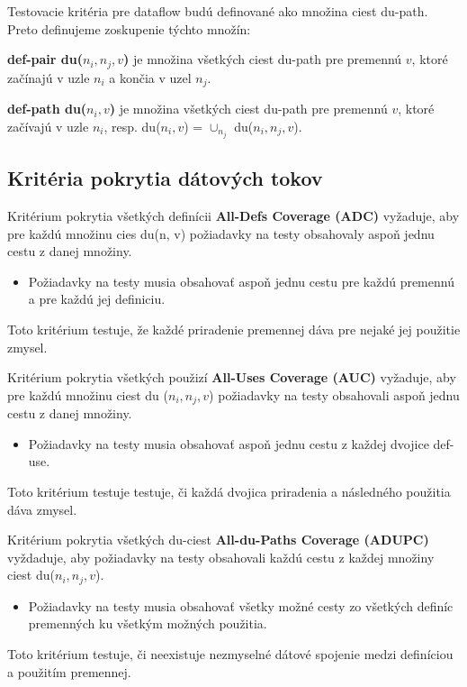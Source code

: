 Testovacie kritéria pre dataflow budú definované ako množina ciest du-path.
Preto definujeme zoskupenie týchto množín:
\begin{description}
	\item \textbf{def-pair du($n_i, n_j, v$)} je množina všetkých ciest du-path pre premennú $v$, ktoré začínajú v uzle $n_i$ a končia v uzel $n_j$.

	\item \textbf{def-path du($n_i, v$)} je množina všetkých ciest du-path pre premennú $v$, ktoré začívajú v uzle $n_i$, resp. du($n_i, v$) = $\cup_{n_j}$ du($n_i, n_j, v$).
\end{description}

\subsection*{Kritéria pokrytia dátových tokov}
\begin{description}
	\item Kritérium pokrytia všetkých definícii \textbf{All-Defs Coverage (ADC)} vyžaduje, aby pre každú množinu cies du(n, v) požiadavky na testy obsahovaly aspoň jednu cestu z danej množiny.
		\begin{itemize}
			\item Požiadavky na testy musia obsahovať aspoň jednu cestu pre každú premennú a pre každú jej definiciu.
		\end{itemize}
		Toto kritérium testuje, že každé priradenie premennej dáva pre nejaké jej použitie zmysel.

	\item Kritérium pokrytia všetkých použizí \textbf{All-Uses Coverage (AUC)} vyžaduje, aby pre každú množinu ciest du ($n_i, n_j, v$) požiadavky na testy obsahovali aspoň jednu cestu z danej množiny.
		\begin{itemize}
			\item Požiadavky na testy musia obsahovať aspoň jednu cestu z každej dvojice def-use.
		\end{itemize}
		Toto kritérium testuje testuje, či každá dvojica priradenia a následného použitia dáva zmysel.

	\item Kritérium pokrytia všetkých du-ciest \textbf{All-du-Paths Coverage (ADUPC)} vyždaduje, aby požiadavky na testy obsahovali každú cestu z každej množiny ciest du($n_i, n_j, v$).
		\begin{itemize}
			\item Požiadavky na testy musia obsahovať všetky možné cesty zo všetkých definíc premenných ku všetkým možných použitia.
		\end{itemize}
		Toto kritérium testuje, či neexistuje nezmyselné dátové spojenie medzi definíciou a použitím premennej.
\end{description}

